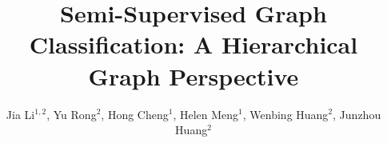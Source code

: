 \documentclass[sigconf]{acmart}
\newcommand{\eat}[1]{}
\begin{document}
\title{Semi-Supervised Graph Classification: A Hierarchical Graph Perspective}





\eat{
\author{Jia Li}
\affiliation{\department{Department of Systems Engineering and Engineering  Management}
  \institution{The Chinese University of Hong Kong}
  \institution{Tencent AI Lab}
}
\email{lijia@se.cuhk.edu.hk}

\author{Yu Rong}
\affiliation{\institution{Tencent AI Lab}
  \city{Shenzhen}
}
\email{yu.rong@hotmail.com}

\author{Hong Cheng}
\affiliation{\department{Department of Systems Engineering and Engineering  Management}
  \institution{The Chinese University of Hong Kong}
}
\email{hcheng@se.cuhk.edu.hk}


\author{Helen Meng}
\affiliation{\department{Department of Systems Engineering and Engineering  Management}
  \institution{The Chinese University of Hong Kong}
}
\email{hmmeng@se.cuhk.edu.hk}


\author{Wenbing Huang}
\affiliation{\institution{Tencent AI Lab}
  \city{Shenzhen}
}
\email{hwenbing@126.com}

\author{Junzhou Huang}
\affiliation{\institution{Tencent AI Lab}
  \city{Shenzhen}
}
\email{joehhuang@tencent.com}
}


\author{Jia Li$^{1,2}$, Yu Rong$^2$, Hong Cheng$^1$, Helen Meng$^1$, Wenbing Huang$^2$, Junzhou Huang$^2$}

\renewcommand{\shortauthors}{J. Li et al.}
\end{document}
